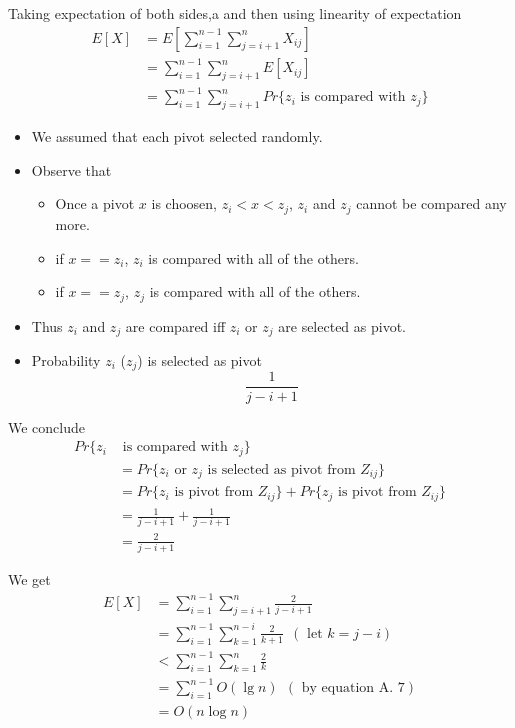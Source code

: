 \documentclass{beamer}
\begin{document}
\begin{frame}{}

Taking expectation of both sides,a and then using linearity of expectation
\begin{align*}
E[X] &= E \left[  \sum_{i=1}^{n-1}\sum_{j=i+1}^nX_{ij} \right]\\
 &= \sum_{i=1}^{n-1}\sum_{j=i+1}^nE[X_{ij}] \\
 &= \sum_{i=1}^{n-1}\sum_{j=i+1}^n Pr \{ z_i \mbox{ is compared with } z_j \}
\end{align*}

\end{frame}

\begin{frame}{}

\begin{itemize}
\item We assumed that each pivot selected randomly. 
\item Observe that 
\begin{itemize}
\item Once a pivot $x$ is choosen, $z_i<x<z_j$, $z_i$ and $z_j$ cannot be compared any more. 
\item if $x==z_i$, $z_i$ is compared with all of the others. 
\item if $x==z_j$, $z_j$ is compared with all of the others.  
\end{itemize}
\item Thus $z_i$ and $z_j$ are compared iff $z_i$ or $z_j$ are selected as pivot. 
\item Probability $z_i$ ($z_j$) is selected as pivot  $$\frac{1}{j-i+1}$$ 
\end{itemize}
\end{frame}

\begin{frame}{}

 We conclude
\begin{align*}
Pr\{ z_i &\mbox{ is compared with }z_j\} \\
 &= Pr\{z_i \mbox{ or } z_j \mbox{ is selected as pivot from } Z_{ij}\} \\
 &= Pr\{z_i \mbox{ is pivot from }Z_{ij} \} + Pr \{ z_j \mbox{ is pivot from } Z_{ij}\} \\
 &= \frac{1}{j-i+1} +\frac{1}{j-i+1} \\
 &= \frac{2}{j-i+1} 
\end{align*}
\end{frame}

\begin{frame}{}

We get 
\begin{align*}
E[X] &= \sum_{i=1}^{n-1}\sum_{j=i+1}^n\frac{2}{j-i+1} \\
  &= \sum_{i=1}^{n-1}\sum_{k=1}^{n-i}\frac{2}{k+1} \ \ (\mbox{ let } k=j-i) \\
  &< \sum_{i=1}^{n-1}\sum_{k=1}^n\frac{2}{k} \\
  &= \sum_{i=1}^{n-1}O(\lg n) \ \ (\mbox{ by equation A. 7}) \\
  &= O(n\log n)
\end{align*}
\end{frame}
\end{document}
